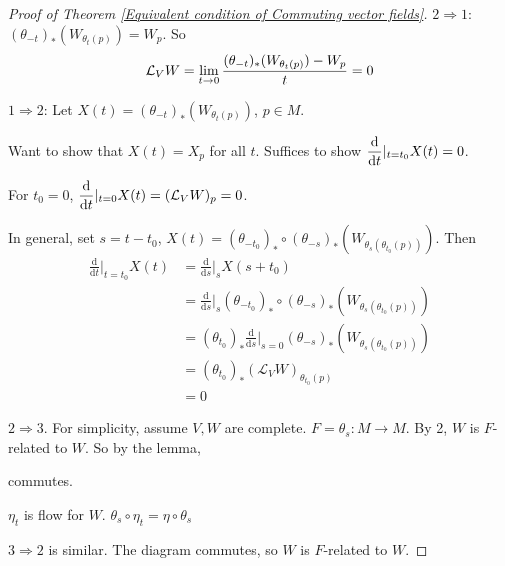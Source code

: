 \begin{proof}[Proof of Theorem \ref{Equivalent condition of Commuting vector fields}]
     $ 2\Rightarrow 1 $:  $ (\theta_{-t})_*(W_{\theta_t(p)})=W_p $. So  \[ \mathcal L_VW=\displaystyle\lim\limits_{t\to 0}\frac{(\theta_{-t})_*(W_{\theta_t(p)})-W_p}{t}=0 \]
     
     
     $ 1\Rightarrow 2 $: Let  $ X(t)=(\theta_{-t})_*(W_{\theta_t(p)}) $,  $ p\in M $.
     
     Want to show that  $ X(t)=X_p $ for all  $ t $. Suffices to show  $ \displaystyle\frac{\mathrm{d}}{\mathrm{d}t}|_{t=t_0}X(t)=0 $. 
     
     For  $ t_0=0 $,  $ \displaystyle\frac{\mathrm{d}}{\mathrm{d}t}|_{t=0}X(t)=(\mathcal{L}_VW)_p=0 $.
     
     In general, set  $ s=t-t_0 $,  $ X(t)=(\theta_{-t_0})_*\circ (\theta_{-s})_*(W_{\theta_s(\theta_{t_0}(p))}) $.
     Then 
     \begin{align*}
        \frac{\mathrm{d}}{\mathrm{d}t}|_{t=t_0}X(t)&=\frac{\mathrm{d}}{\mathrm{d}s}|_sX(s+t_0)\\
        &=\frac{\mathrm{d}}{\mathrm{d}s}|_s(\theta_{-t_0})_*\circ (\theta_{-s})_*(W_{\theta_s(\theta_{t_0}(p))})\\
        &=(\theta_{t_0})_*\frac{\mathrm{d}}{\mathrm{d}s}|_{s=0}(\theta_{-s})_*(W_{\theta_s(\theta_{t_0}(p))})\\
        &=(\theta_{t_0})_*(\mathcal{L}_VW)_{\theta_{t_0}(p)}\\
        &=0
     \end{align*}
     
      $ 2\Rightarrow3 $. For simplicity, assume  $ V,W $ are complete.  $ F=\theta_s:M\rightarrow M $. By 2,  $ W $ is  $ F $-related to  $ W $. So by the lemma,
      \begin{center}
        commutes.
    \end{center}  
    
    $ \eta_t $ is flow for  $ W $. \ie  $ \theta_s\circ\eta_t=\eta\circ \theta_s $ 
      
       $ 3\Rightarrow 2 $  is similar. The diagram commutes, so  $ W $ is  $ F $-related to  $ W $.   
\end{proof}